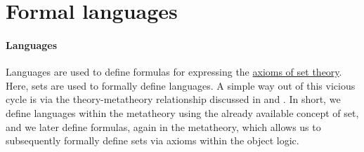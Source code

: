\section{Formal languages}\label{sec:formal_languages}

\paragraph{Languages}

Languages are used to define formulas for expressing the \hyperref[def:zfc]{axioms of set theory}. Here, sets are used to formally define languages. A simple way out of this vicious cycle is via the theory-metatheory relationship discussed in  and . In short, we define languages within the metatheory using the already available concept of set, and we later define formulas, again in the metatheory, which allows us to subsequently formally define sets via axioms within the object logic.

